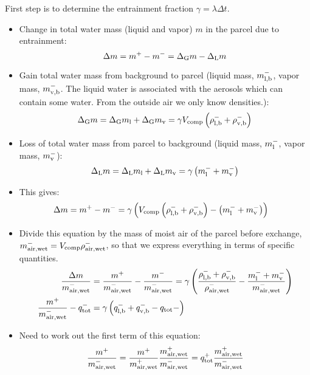 \documentclass{article}
\begin{document}
First step is to determine the entrainment fraction $\gamma = \lambda \Delta t$.
\begin{itemize}
\item Change in total water mass (liquid and vapor) $m$ in the parcel due to entrainment:
\begin{equation}
\Delta m = m^+ - m^- = \Delta_{\rm G}m -\Delta_{\rm L}m 
\end{equation}
\item Gain total water mass from background to parcel (liquid mass,
  $m_{\rm l,b}^-$, vapor mass, $m_{\rm v,b}^-$. The liquid water is
  associated with the aerosols which can contain some water. From the
  outside air we only know densities.):
\begin{equation}
\Delta_{\rm G}m = \Delta_{\rm G}m_{\rm l} + \Delta_{\rm G}m_{\rm v} = \gamma V_{\rm comp} \left(\rho_{\rm l,b}^- + \rho_{\rm v,b}^-\right)
\end{equation}
\item Loss of total water mass from parcel to background (liquid mass,
  $m_{\rm l}^-$, vapor mass, $m_{\rm v}^-$):
\begin{equation}
\Delta_{\rm L}m = \Delta_{\rm L}m_{\rm l} + \Delta_{\rm L}m_{\rm v} = \gamma \left(m_{\rm l}^- + m_{\rm v}^-\right)
\end{equation}
\item This gives:
\begin{align}
\Delta m &= m^+ - m^- = \gamma \left(V_{\rm comp} \left(\rho_{\rm l,b}^- + \rho_{\rm v,b}^-\right) - \left(m_{\rm l}^- + m_{\rm v}^-\right)\right)
\end{align}
\item Divide this equation by the mass of moist air of the parcel
  before exchange, $m_{\rm air, wet}^- = V_{\rm comp}\rho_{\rm air,
    wet}^-$, so that we express everything in terms of specific
  quantities.
\begin{align}
\frac{\Delta m}{m_{\rm air, wet}^-} &= \frac{m^+}{m_{\rm air, wet}^-} - \frac{m^-}{m_{\rm air, wet}^-} = \gamma \left(\frac{\rho_{\rm l,b}^- + \rho_{\rm v,b}^-}{\rho_{\rm air, wet}^-} - \frac{m_{\rm l}^- + m_{\rm v}^-}{m_{\rm air, wet}^-}\right)\\
\frac{m^+}{m_{\rm air, wet}^-} - q_{\rm tot}^- &= \gamma \left(q_{\rm l,b}^- + q_{\rm v,b}^- - q_{\rm tot}-\right)
\end{align}
\item Need to work out the first term of this equation:
\begin{align}
\frac{m^+}{m_{\rm air, wet}^-} & = \frac{m^+}{m_{\rm air, wet}^+} \frac{m_{\rm air, wet}^+}{m_{\rm air, wet}^-} = q_{\rm tot}^+ \frac{m_{\rm air, wet}^+}{m_{\rm air, wet}^-}\\

\end{align}
\end{itemize}
\end{document}
